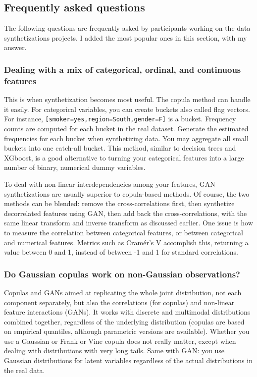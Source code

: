 \documentclass[oneside,10pt]{book}
\begin{document}
\subsection{Frequently asked questions}

The following questions are frequently asked by participants working on the data synthetizations projects. I added the most popular ones in this section, with my answer.

\subsubsection{Dealing with a mix of categorical, ordinal, and continuous features}

This is when synthetization becomes most useful. The copula method can handle it easily. For categorical variables, you can create buckets also called flag vectors. For instance, 
\texttt{[smoker=yes,region=South,gender=F]} is a bucket.  Frequency counts are computed for each bucket in the real dataset. Generate the estimated frequencies for each bucket when synthetizing data. You may aggregate all small buckets into one catch-all bucket. This method, similar to decision trees and \textcolor{index}{XGboost}, is a good alternative to turning your categorical features into a large number of binary, numerical 
\textcolor{index}{dummy variables}.

To deal with non-linear interdependencies among your features, GAN synthetizations  are usually superior to copula-based methods. Of course, the two methods can be blended: remove the cross-correlations first, then synthetize decorrelated features using GAN, then add back the cross-correlations, with the same linear transform and inverse transform as discussed earlier.
One issue is how to measure the correlation between categorical features, or between categorical and numerical features. Metrics such as 
\textcolor{index}{Cramér's V} accomplish this, returning a value between 0 and 1, instead of between -1 and 1 for standard correlations.

\subsubsection{Do Gaussian copulas work on non-Gaussian observations?}

Copulas and GANs aimed at replicating the whole joint distribution, not each component separately, but also the correlations (for copulas) and non-linear feature interactions (GANs). It works with discrete and multimodal distributions combined together, regardless of the underlying distribution (copulas are based on empirical quantiles, although parametric versions are available).
Whether you use a Gaussian or Frank or Vine copula does not really matter, except when dealing with distributions with very long tails. Same with GAN: you use Gaussian distributions for latent variables regardless of the actual distributions in the real data.
\end{document}
